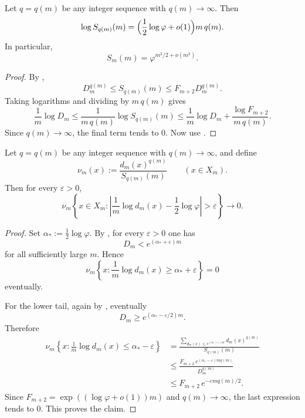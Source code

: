 \begin{theorem}
\label{thm:diagonal-high-moments}
Let \(q=q(m)\) be any integer sequence with \(q(m)\to\infty\).  Then
\[
  \log S_{q(m)}(m)
  =
  \Bigl(\frac12\log\varphi+o(1)\Bigr)m\,q(m).
\]
In particular,
\[
  S_m(m)=\varphi^{m^2/2+o(m^2)}.
\]
\end{theorem}

\begin{proof}
By ,
\[
  D_m^{q(m)}\le S_{q(m)}(m)\le F_{m+2}D_m^{q(m)}.
\]
Taking logarithms and dividing by \(m\,q(m)\) gives
\[
  \frac{1}{m}\log D_m
  \le
  \frac{1}{m\,q(m)}\log S_{q(m)}(m)
  \le
  \frac{1}{m}\log D_m+\frac{\log F_{m+2}}{m\,q(m)}.
\]
Since \(q(m)\to\infty\), the final term tends to \(0\).  Now use
.
\end{proof}

\begin{theorem}
\label{thm:zero-temp-concentration}
Let \(q=q(m)\) be any integer sequence with \(q(m)\to\infty\), and define
\[
  \nu_m(x):=\frac{d_m(x)^{q(m)}}{S_{q(m)}(m)}
  \qquad (x\in X_m).
\]
Then for every \(\varepsilon>0\),
\[
  \nu_m\!\left\{
    x\in X_m:
    \left|\frac1m\log d_m(x)-\frac12\log\varphi\right|>\varepsilon
  \right\}\to 0.
\]
\end{theorem}

\begin{proof}
Set \(\alpha_\ast:=\frac12\log\varphi\).  By , for every
\(\varepsilon>0\) one has
\[
  D_m<e^{(\alpha_\ast+\varepsilon)m}
\]
for all sufficiently large \(m\).  Hence
\[
  \nu_m\!\left\{
    x:\frac1m\log d_m(x)\ge \alpha_\ast+\varepsilon
  \right\}=0
\]
eventually.

For the lower tail, again by , eventually
\[
  D_m\ge e^{(\alpha_\ast-\varepsilon/2)m}.
\]
Therefore
\begin{align*}
  \nu_m\!\left\{
    x:\frac1m\log d_m(x)\le \alpha_\ast-\varepsilon
  \right\}
  &=
  \frac{\sum_{d_m(x)\le e^{(\alpha_\ast-\varepsilon)m}} d_m(x)^{q(m)}}{S_{q(m)}(m)} \\
  &\le
  \frac{F_{m+2}\,e^{(\alpha_\ast-\varepsilon)m q(m)}}{D_m^{q(m)}} \\
  &\le
  F_{m+2}\,e^{-\varepsilon m q(m)/2}.
\end{align*}
Since \(F_{m+2}=\exp((\log\varphi+o(1))m)\) and \(q(m)\to\infty\), the last
expression tends to \(0\).  This proves the claim.
\end{proof}

